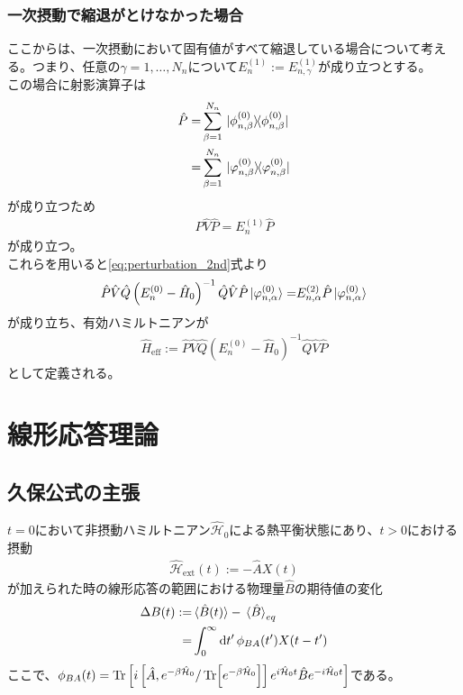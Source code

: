 \documentclass{ltjsarticle}
\begin{document}
\subsubsection{一次摂動で縮退がとけなかった場合}
ここからは、一次摂動において固有値がすべて縮退している場合について考える。つまり、任意の$\gamma=1,\dots,N_n$について$E_n^{(1)}:=E_{n,\gamma}^{(1)}$が成り立つとする。\\
この場合に射影演算子は
\begin{align}
  \hat{P}=&\sum_{\beta=1}^{N_n}\ketbra*{\phi^{(0)}_{n,\beta}}{\phi^{(0)}_{n,\beta}}\\
  =&\sum_{\beta=1}^{N_n}\ketbra*{\varphi^{(0)}_{n,\beta}}{\varphi^{(0)}_{n,\beta}}\\
\end{align}
が成り立つため
\begin{align}
  \hat{P}\hat{V}\hat{P}=E_n^{(1)}\hat{P}
\end{align}
が成り立つ。\\
これらを用いると\eqref{eq:perturbation_2nd}式より
\begin{align}
  \hat{P}\hat{V}\hat{Q}\left( E_n^{(0)}-\hat{H}_0 \right)^{-1}\hat{Q}\hat{V}\hat{P}\ket*{\varphi^{(0)}_{n,\alpha}}=&E^{(2)}_{n,\alpha}\hat{P}\ket*{\varphi^{(0)}_{n,\alpha}}\\
\end{align}
が成り立ち、有効ハミルトニアンが
\begin{align}
  \hat{H}_{\text{eff}}:=\hat{P}\hat{V}\hat{Q}\left( E_n^{(0)}-\hat{H}_0 \right)^{-1}\hat{Q}\hat{V}\hat{P}
\end{align}
として定義される。
\section{線形応答理論}
\subsection{久保公式の主張}
$t=0$において非摂動ハミルトニアン$\hat{\mathcal{H}}_0$による熱平衡状態にあり、$t>0$における摂動
\begin{align}
  \hat{\mathcal{H}}_{\textrm{ext}}(t):=-\hat{A}X(t)
\end{align}
が加えられた時の線形応答の範囲における物理量$\hat{B}$の期待値の変化\\
\begin{align}
  \Delta B(t):=&\ev*{\hat{B}(t)}-\ev*{\hat{B}}_{eq}\\
  =&\int^\infty_0\dd{t'}\phi_{BA}(t')X(t-t')\\
\end{align}
ここで、$\phi_{BA}(t)=\Tr\left[i\left[\hat{A},e^{-\beta \hat{\mathcal{H}}_0}/\Tr[e^{-\beta\hat{\mathcal{H}}_0}]\right]e^{i\hat{\mathcal{H}}_0 t}\hat{B}e^{-i\hat{\mathcal{H}}_0 t}\right]$である。\\
\end{document}
